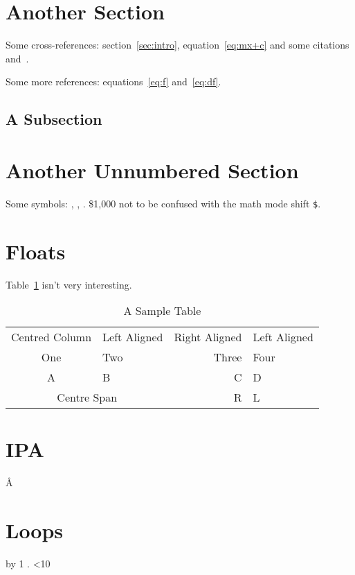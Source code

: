 \documentclass{article}
\begin{document}
\section{Another Section}

Some cross-references: section~\ref{sec:intro},
equation~\ref{eq:mx+c} and some
citations~\cite{article-full,incollection-full}
and~\cite[some text]{inproceedings-full}.

Some more references: equations~\ref{eq:f} and~\ref{eq:df}.

\lipsum[2-3]

\subsection{A Subsection}

\lipsum[6-7]

\section*{Another Unnumbered Section}

Some symbols: , , . \$1,000 not to be
confused with the math mode shift \verb|$|.

\lipsum[8-9]

\section{Floats}
\label{sec:floats}

Table~\ref{tab:sample} isn't very interesting.

\begin{table}[htbp]
\caption{A Sample Table}
\label{tab:sample}
\centering
\begin{tabular}{clrl}
Centred Column & Left Aligned & Right Aligned & Left Aligned\\
One & Two & Three & Four\\
A & B & C & D\\
\multicolumn{2}{|c|}{Centre Span} & R & L
\end{tabular}
\end{table}

\section{IPA}
 \AA {}
\textschwa

\section{Loops}

\newcount\myctr
\loop
 \advance\myctr by 1\relax
 \the\myctr.
\ifnum\myctr<10
\repeat



\end{document}
